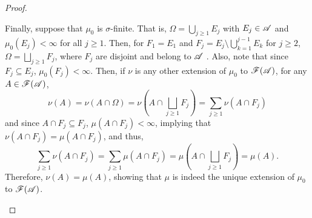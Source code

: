 \begin{proof}
\begin{enumerate}
            Finally, suppose that $\mu_0$ is $\sigma$-finite. That is, $\Omega = \bigcup_{j \geq 1} E_j$ with $E_j \in \mathscr{A}$ and $\mu_0(E_j) < \infty$ for all $j \geq 1$. Then, for $F_1 = E_1$ and $F_j = E_j \setminus \bigcup_{k = 1}^{j - 1} E_k$ for $j \geq 2$, $\Omega = \bigsqcup_{j \geq 1} F_j$, where $F_j$ are disjoint and belong to $\mathscr{A}$ . Also, note that since $F_j \subseteq E_j$, $\mu_0(F_j) < \infty$. Then, if $\nu$ is any other extension of $\mu_0$ to $\mathscr{F}(\mathscr{A})$, for any $A \in \mathscr{F}(\mathscr{A})$,
            \begin{equation*}
                \nu(A) = \nu\left( A \cap \Omega\right) = \nu\left( A \cap \bigsqcup_{j \geq 1} F_j\right) = \sum_{j \ge 1} \nu(A \cap F_j) 
            \end{equation*}
            and since $A \cap F_j \subseteq F_j$, $\mu(A \cap F_j) < \infty$, implying that $\nu(A \cap F_j) = \mu(A \cap F_j)$, and thus,
            \begin{equation*}
                \sum_{j \ge 1} \nu(A \cap F_j) = \sum_{j \ge 1} \mu(A \cap F_j) =  \mu\left( A \cap \bigsqcup_{j \geq 1} F_j\right) = \mu(A).
            \end{equation*}
            Therefore, $\nu(A) = \mu(A)$, showing that $\mu$ is indeed the unique extension of $\mu_0$ to $\mathscr{F}(\mathscr{A})$.
        \end{enumerate}
    \end{proof}


